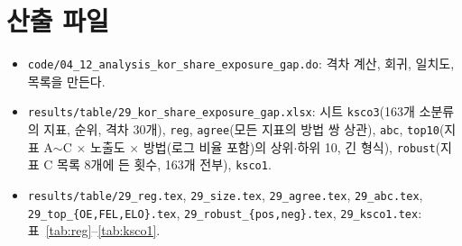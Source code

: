 \documentclass[11pt]{article}
\begin{document}
\section{산출 파일}

\begin{itemize}[leftmargin=*]
  \item \texttt{code/04\_12\_analysis\_kor\_share\_exposure\_gap.do}: 격차 계산, 회귀, 일치도, 목록을 만든다.
  \item \texttt{results/table/29\_kor\_share\_exposure\_gap.xlsx}: 시트 \texttt{ksco3}(163개 소분류의 지표, 순위, 격차 30개), \texttt{reg}, \texttt{agree}(모든 지표의 방법 쌍 상관), \texttt{abc}, \texttt{top10}(지표 A$\sim$C $\times$ 노출도 $\times$ 방법(로그 비율 포함)의 상위$\cdot$하위 10, 긴 형식), \texttt{robust}(지표 C 목록 8개에 든 횟수, 163개 전부), \texttt{ksco1}.
  \item \texttt{results/table/29\_reg.tex}, \texttt{29\_size.tex}, \texttt{29\_agree.tex}, \texttt{29\_abc.tex}, \texttt{29\_top\_\{OE,FEL,ELO\}.tex}, \texttt{29\_robust\_\{pos,neg\}.tex}, \texttt{29\_ksco1.tex}: 표~\ref{tab:reg}--\ref{tab:ksco1}.
\end{itemize}
\end{document}
